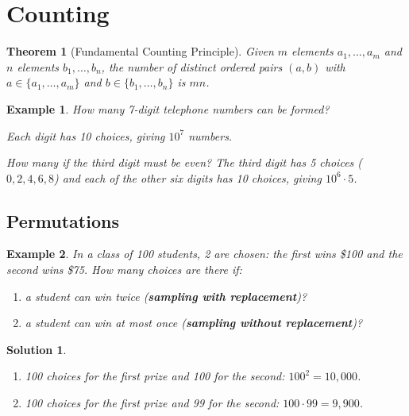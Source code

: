 \documentclass{article}
\newtheorem{theorem}{Theorem}
\newtheorem{solution}{Solution}
\newtheorem*{example}{Example}
\begin{document}
\section{Counting}

\begin{theorem}[Fundamental Counting Principle]
Given $m$ elements $a_1, \ldots, a_m$ and $n$ elements $b_1, \ldots, b_n$, the number of distinct ordered pairs $(a, b)$ with $a \in \{a_1, \ldots, a_m\}$ and $b \in \{b_1, \ldots, b_n\}$ is $mn$.
\end{theorem}

\begin{example}
How many 7-digit telephone numbers can be formed?

Each digit has 10 choices, giving $10^7$ numbers.

\textit{How many if the third digit must be even?} The third digit has 5 choices ($0, 2, 4, 6, 8$) and each of the other six digits has 10 choices, giving $10^6 \cdot 5$.
\end{example}

\subsection{Permutations}

\begin{example}
In a class of 100 students, 2 are chosen: the first wins \$100 and the second wins \$75. How many choices are there if:
\begin{enumerate}
    \item a student can win twice (\textbf{sampling with replacement})?
    \item a student can win at most once (\textbf{sampling without replacement})?
\end{enumerate}
\end{example}

\begin{solution}
\begin{enumerate}
    \item 100 choices for the first prize and 100 for the second: $100^2 = 10{,}000$.
    \item 100 choices for the first prize and 99 for the second: $100 \cdot 99 = 9{,}900$.
\end{enumerate}
\end{solution}
\end{document}
